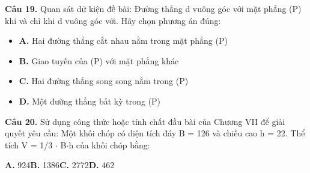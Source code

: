 \documentclass[11pt,a4paper]{article}
\begin{document}
\textbf{\color{primary} Câu 19.} Quan sát dữ kiện đề bài: Đường thẳng d vuông góc với mặt phẳng (P) khi và chỉ khi d vuông góc với. Hãy chọn phương án đúng:\par
\begin{itemize}\setlength{\itemsep}{1pt}\setlength{\parskip}{0pt}
  \item[] \textbf{A.} Hai đường thẳng cắt nhau nằm trong mặt phẳng (P)
  \item[] \textbf{B.} Giao tuyến của (P) với mặt phẳng khác
  \item[] \textbf{C.} Hai đường thẳng song song nằm trong (P)
  \item[] \textbf{D.} Một đường thẳng bất kỳ trong (P)
\end{itemize}\vspace{2pt}
\textbf{\color{primary} Câu 20.} Sử dụng công thức hoặc tính chất đầu bài của Chương VII để giải quyết yêu cầu: Một khối chóp có diện tích đáy B = 126 và chiều cao h = 22. Thể tích V = 1/3 $\cdot$ B$\cdot$h của khối chóp bằng:\par
\hspace*{1.5em}\textbf{A.} 924\quad\quad \textbf{B.} 1386\quad\quad \textbf{C.} 2772\quad\quad \textbf{D.} 462\par\vspace{2pt}
\end{document}
